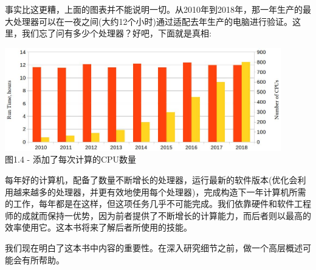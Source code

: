 事实比这更糟，上面的图表并不能说明一切。从2010年到2018年，那一年生产的最大处理器可以在一夜之间(大约12个小时)通过适配去年生产的电脑进行验证。这里，我们忘了问有多少个处理器？好吧，下面就是真相:

\begin{center}
\includegraphics[width=0.9\textwidth]{content/1/chapter1/images/4.jpg}\\
图1.4 - 添加了每次计算的CPU数量
\end{center}

每年好的计算机，配备了数量不断增长的处理器，运行最新的软件版本(优化会利用越来越多的处理器，并更有效地使用每个处理器)，完成构造下一年计算机所需的工作，每年都是在这样，但这项任务几乎不可能完成。我们依靠硬件和软件工程师的成就而保持一优势，因为前者提供了不断增长的计算能力，而后者则以最高的效率使用它。这本书将来了解后者所使用的技能。

我们现在明白了这本书中内容的重要性。在深入研究细节之前，做一个高层概述可能会有所帮助。


















